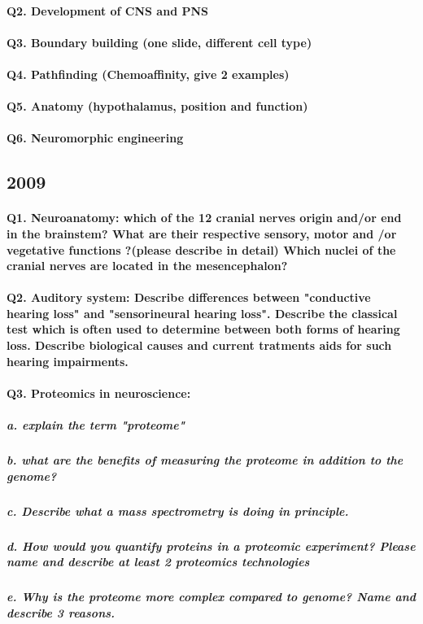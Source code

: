 \documentclass[12pt,article,oneside,a4paper]{memoir}
\begin{document}
\paragraph{Q2. Development of CNS and PNS}
\paragraph{Q3. Boundary building (one slide, different cell type)}
\paragraph{Q4. Pathfinding (Chemoaffinity, give 2 examples)}
\paragraph{Q5. Anatomy (hypothalamus, position and function)}
\paragraph{Q6. Neuromorphic engineering}

\subsection{2009}
\paragraph{Q1. Neuroanatomy: which of the 12 cranial nerves origin and/or end in the brainstem? What are their respective sensory, motor and /or vegetative functions ?(please describe in detail) Which nuclei of the cranial nerves are located in the mesencephalon?}
\paragraph{Q2. Auditory system: Describe differences between "conductive hearing loss" and "sensorineural hearing loss". Describe the classical test which is often used to determine between both forms of hearing loss. Describe biological causes and current tratments aids for such hearing impairments.}
\paragraph{Q3. Proteomics in neuroscience:}
\subparagraph{a. explain the term "proteome"}
\subparagraph{b. what are the benefits of measuring the proteome in addition to the genome?}
\subparagraph{c. Describe what a mass spectrometry is doing in principle.}
\subparagraph{d. How would you quantify proteins in a proteomic experiment? Please name and describe at least 2 proteomics technologies}
\subparagraph{e. Why is the proteome more complex compared to genome? Name and describe 3 reasons.}
\end{document}
